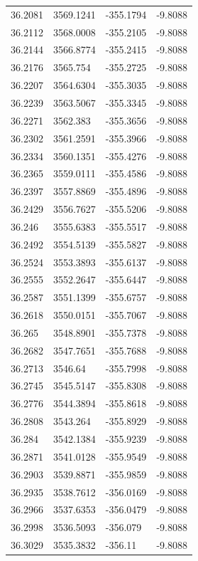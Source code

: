 \begin{table}[H]
\begin{tabular}{llll}
36.2081 & 3569.1241 & -355.1794 & -9.8088 \\
36.2112 & 3568.0008 & -355.2105 & -9.8088 \\
36.2144 & 3566.8774 & -355.2415 & -9.8088 \\
36.2176 & 3565.754 & -355.2725 & -9.8088 \\
36.2207 & 3564.6304 & -355.3035 & -9.8088 \\
36.2239 & 3563.5067 & -355.3345 & -9.8088 \\
36.2271 & 3562.383 & -355.3656 & -9.8088 \\
36.2302 & 3561.2591 & -355.3966 & -9.8088 \\
36.2334 & 3560.1351 & -355.4276 & -9.8088 \\
36.2365 & 3559.0111 & -355.4586 & -9.8088 \\
36.2397 & 3557.8869 & -355.4896 & -9.8088 \\
36.2429 & 3556.7627 & -355.5206 & -9.8088 \\
36.246 & 3555.6383 & -355.5517 & -9.8088 \\
36.2492 & 3554.5139 & -355.5827 & -9.8088 \\
36.2524 & 3553.3893 & -355.6137 & -9.8088 \\
36.2555 & 3552.2647 & -355.6447 & -9.8088 \\
36.2587 & 3551.1399 & -355.6757 & -9.8088 \\
36.2618 & 3550.0151 & -355.7067 & -9.8088 \\
36.265 & 3548.8901 & -355.7378 & -9.8088 \\
36.2682 & 3547.7651 & -355.7688 & -9.8088 \\
36.2713 & 3546.64 & -355.7998 & -9.8088 \\
36.2745 & 3545.5147 & -355.8308 & -9.8088 \\
36.2776 & 3544.3894 & -355.8618 & -9.8088 \\
36.2808 & 3543.264 & -355.8929 & -9.8088 \\
36.284 & 3542.1384 & -355.9239 & -9.8088 \\
36.2871 & 3541.0128 & -355.9549 & -9.8088 \\
36.2903 & 3539.8871 & -355.9859 & -9.8088 \\
36.2935 & 3538.7612 & -356.0169 & -9.8088 \\
36.2966 & 3537.6353 & -356.0479 & -9.8088 \\
36.2998 & 3536.5093 & -356.079 & -9.8088 \\
36.3029 & 3535.3832 & -356.11 & -9.8088 \\

\end{tabular}
\end{table}
